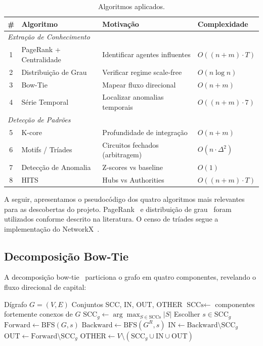 \documentclass[12pt,a4paper]{article}
\begin{document}
\begin{table}[H]
\centering
\caption{Algoritmos aplicados.}
\label{tab:algoritmos}
\small
\begin{tabular}{clll}
\toprule
\# & Algoritmo & Motivação & Complexidade \\
\midrule
\multicolumn{4}{l}{\textit{Extração de Conhecimento}} \\
1 & PageRank + Centralidade & Identificar agentes influentes & $O((n+m) \cdot T)$ \\
2 & Distribuição de Grau    & Verificar regime scale-free    & $O(n \log n)$ \\
3 & Bow-Tie                 & Mapear fluxo direcional        & $O(n+m)$ \\
4 & Série Temporal          & Localizar anomalias temporais  & $O((n+m) \cdot 7)$ \\
\midrule
\multicolumn{4}{l}{\textit{Detecção de Padrões}} \\
5 & K-core                  & Profundidade de integração     & $O(n+m)$ \\
6 & Motifs / Tríades        & Circuitos fechados (arbitragem)& $O(n \cdot \Delta^2)$ \\
7 & Detecção de Anomalia    & Z-scores vs baseline           & $O(1)$ \\
8 & HITS                    & Hubs vs Authorities            & $O((n+m) \cdot T)$ \\
\bottomrule
\end{tabular}
\end{table}

A seguir, apresentamos o pseudocódigo dos quatro algoritmos mais relevantes para as descobertas do projeto. PageRank~\cite{page1999} e distribuição de grau~\cite{barabasi1999} foram utilizados conforme descrito na literatura. O censo de tríades segue a implementação do NetworkX~\cite{networkx}.

\subsection{Decomposição Bow-Tie}

A decomposição bow-tie~\cite{broder2000} particiona o grafo em quatro componentes, revelando o fluxo direcional de capital:

\begin{algorithm}[H]
\caption{Decomposição Bow-Tie}
\begin{algorithmic}[1]
\Require Dígrafo $G = (V, E)$
\Ensure Conjuntos SCC, IN, OUT, OTHER
\State $\text{SCCs} \gets$ componentes fortemente conexos de $G$
\State $\text{SCC}_g \gets \arg\max_{S \in \text{SCCs}} |S|$
\State Escolher $s \in \text{SCC}_g$
\State $\text{Forward} \gets \text{BFS}(G, s)$ 
\State $\text{Backward} \gets \text{BFS}(G^R, s)$ 
\State $\text{IN} \gets \text{Backward} \setminus \text{SCC}_g$
\State $\text{OUT} \gets \text{Forward} \setminus \text{SCC}_g$
\State $\text{OTHER} \gets V \setminus (\text{SCC}_g \cup \text{IN} \cup \text{OUT})$
\end{algorithmic}
\end{algorithm}
\end{document}
